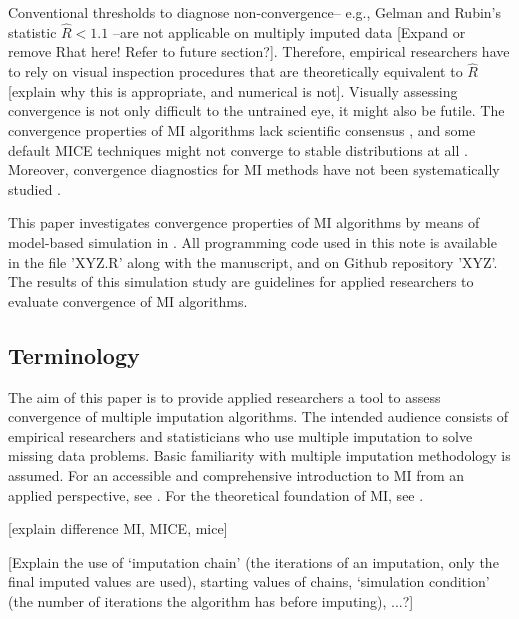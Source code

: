 \documentclass[article]{jss}
\begin{document}
Conventional thresholds to diagnose non-convergence-- e.g., Gelman and Rubin's \citeyear{gelm92} statistic $\widehat{R} < 1.1$ --are not applicable on multiply imputed data \citep{lace07} [Expand or remove Rhat here! Refer to future section?]. Therefore, empirical researchers have to rely on visual inspection procedures that are theoretically equivalent to $\widehat{R}$ \citep{whit11} [explain why this is appropriate, and numerical is not]. Visually assessing convergence is not only difficult to the untrained eye, it might also be futile. The convergence properties of MI algorithms lack scientific consensus \citep{taka17}, and some default MICE techniques might not converge to stable distributions at all \citep{murr18}. Moreover, convergence diagnostics for MI methods have not been systematically studied \citep{buur18}.

This paper investigates convergence properties of MI algorithms by means of model-based simulation in  \citep{R}. All programming code used in this note is available in the file 'XYZ.R' along with the manuscript, and on Github repository 'XYZ'. The results of this simulation study are guidelines for applied researchers to evaluate convergence of MI algorithms. %


\subsection{Terminology} \label{sec:terms}

The aim of this paper is to provide applied researchers a tool to assess convergence of multiple imputation algorithms. The intended audience consists of empirical researchers and statisticians who use multiple imputation to solve missing data problems. Basic familiarity with multiple imputation methodology is assumed. For an accessible and comprehensive introduction to MI from an applied perspective, see \cite{buur18}. For the theoretical foundation of MI, see \cite{rubin87}.  

[explain difference MI, MICE, mice]

[Explain the use of `imputation chain' (the iterations of an imputation, only the final imputed values are used), starting values of chains, `simulation condition' (the number of iterations the algorithm has before imputing), ...?]
\end{document}
